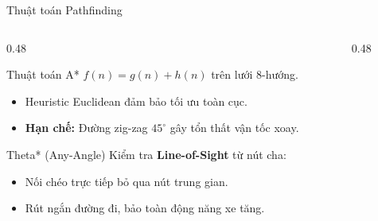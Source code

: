 \documentclass[aspectratio=169]{beamer}
\begin{document}
\begin{frame}{Thuật toán Pathfinding}
  \begin{columns}[T]
    \begin{column}{0.48\textwidth}
      \begin{block}{Thuật toán A*}
        $f(n) = g(n) + h(n)$ trên lưới 8-hướng.
        \begin{itemize}
          \item Heuristic Euclidean đảm bảo tối ưu toàn cục.
          \item \textbf{Hạn chế:} Đường zig-zag $45^\circ$ gây tổn thất vận tốc xoay.
        \end{itemize}
      \end{block}
      \vspace{0.3em}
      \begin{exampleblock}{Theta* (Any-Angle)}
        Kiểm tra \textbf{Line-of-Sight} từ nút cha:
        \begin{itemize}
          \item Nối chéo trực tiếp bỏ qua nút trung gian.
          \item Rút ngắn đường đi, bảo toàn động năng xe tăng.
        \end{itemize}
      \end{exampleblock}
    \end{column}
    \begin{column}{0.48\textwidth}
      \begin{center}
      \end{center}
    \end{column}
  \end{columns}
\end{frame}

\end{document}
